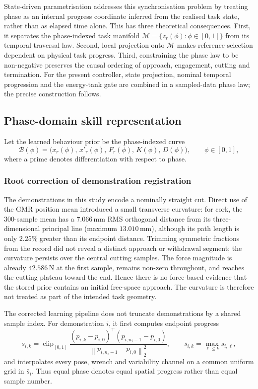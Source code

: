 \documentclass[11pt,a4paper]{article}
\newcommand{\norm}[1]{\left\lVert#1\right\rVert}
\begin{document}
State-driven parametrisation addresses this synchronisation problem by treating
phase as an internal progress coordinate inferred from the realised task
state, rather than as elapsed time alone.  This has three theoretical
consequences.  First, it separates the phase-indexed task manifold
$\mathcal M=\{z_r(\phi):\phi\in[0,1]\}$ from its temporal traversal law.
Second, local projection onto $\mathcal M$ makes reference selection dependent
on physical task progress.  Third, constraining the phase law to be
non-negative preserves the causal ordering of approach, engagement, cutting
and termination.  For the present controller, state projection, nominal
temporal progression and the energy-tank gate are combined in a sampled-data
phase law; the precise construction follows.

\subsection{Phase-domain skill representation}
Let the learned behaviour prior be the phase-indexed curve
\begin{equation}
\mathcal B(\phi)
=\big(x_r(\phi),\,x'_r(\phi),\,F_r(\phi),\,K(\phi),\,D(\phi)\big),
\qquad \phi\in[0,1],
\label{eq:phase_prior}
\end{equation}
where a prime denotes differentiation with respect to phase.

\subsubsection{Root correction of demonstration registration}
The demonstrations in this study encode a nominally straight cut. Direct use
of the GMR position mean introduced a small transverse curvature: for cork,
the 300-sample mean has a $7.066$\,mm RMS orthogonal distance from its
three-dimensional principal line (maximum $13.010$\,mm), although its path
length is only $2.25\%$ greater than its endpoint distance. Trimming symmetric
fractions from the record did not reveal a distinct approach or withdrawal
segment; the curvature persists over the central cutting samples. The force
magnitude is already $42.586$\,N at the first sample, remains non-zero
throughout, and reaches the cutting plateau toward the end. Hence there is no
force-based evidence that the stored prior contains an initial free-space
approach. The curvature is therefore not treated as part of the intended task
geometry.

The corrected learning pipeline does not truncate demonstrations by a shared
sample index. For demonstration $i$, it first computes endpoint progress
\begin{equation}
s_{i,k}=
\operatorname{clip}_{[0,1]}
\frac{(p_{i,k}-p_{i,0})^\top(p_{i,n_i-1}-p_{i,0})}
{\norm{p_{i,n_i-1}-p_{i,0}}_2^2},
\qquad
\bar s_{i,k}=\max_{\ell\leq k}s_{i,\ell},
\label{eq:progress_registration}
\end{equation}
and interpolates every pose, wrench and variability channel on a common
uniform grid in $\bar s_i$. Thus equal phase denotes equal spatial progress
rather than equal sample number.
\end{document}
